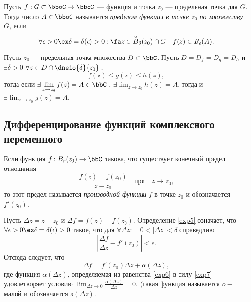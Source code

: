 \begin{defn}
Пусть $f: G\subset \bboC \to \bboC$ --- функция и точка $z_0$ --- предельная точка для $G$. Тогда число $A \in \bboC$ называется \textit{пределом функции в точке $z_0$ по множеству $G$}, если 
$$
\forall \epsilon > 0 \ex \delta = \delta(\epsilon)>0:\fa z \in \overset{\circ} {B}_\delta(z_0)\cap G \quad f(z) \in B_\epsilon(A). 
$$ 
\end{defn}

\begin{thm} 
\label{exp14}
Пусть $z_0$ --- предельная точка множества $D\subset \bbC$. Пусть $D = D_f=D_g=D_h$ и $\exists \delta > 0$ $\forall z \in D \cap \dneio{\delta}{z_0}:$
$$f(z)\le g(z) \le h(z),$$ тогда если $\exists \lim_{z \to z_0}\limits f(z) = A \in \bbC$ , $\exists \lim_{z \to z_0}\limits h(z) = A$, тогда и $\exists \lim_{z \to z_0}\limits g(z) = A$.
\end{thm}

\subsection{Дифференцирование функций комплексного переменного}
\begin{defn}
\label{exp5}
Если функция  $f : B_r(z_0) \to \bbC $ такова, что существует конечный предел отношения
$$
\frac{f(z)-f(z_0)}{z-z_0} \quad\text{при}\quad z \to z_0,
$$
то этот предел называется \textit{производной функции} $f$ в точке $z_0$ и обозначается $f'(z_0)$. 
\end{defn}
Пусть $\Delta z = z - z_0$ и $\Delta f = f(z) - f(z_0)$. Определение \ref{exp5} означает, что $\forall \epsilon > 0 \ex \delta=\delta(\epsilon)>0$ такое, что для $\forall \Delta z:\quad 0 <|\Delta z| <\delta$ справедливо 
\begin{equation}
\label{exp7}
\left|\frac{\Delta f}{\Delta z} - f'(z_0) \right| < \epsilon.
\end{equation}
Отсюда следует, что 
\begin{equation}
\label{exp6}
\Delta f = f'(z_0)\Delta z + \alpha(\Delta z),
\end{equation}
где функция $\alpha(\Delta z)$, определяемая из равенства \eqref{exp6} в силу \eqref{exp7} удовлетворяет условию $\lim_{\Delta z \to 0}\limits \frac{\alpha(\Delta z)}{\Delta z} = 0$. (такая функция называется $o-$малой и обозначается $o(\Delta z)$.

